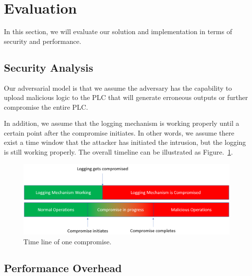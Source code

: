 \section{Evaluation}

In this section, we will evaluate our solution and implementation in terms of security and performance. 

\subsection{Security Analysis}

Our adversarial model is that we assume the adversary has the capability to upload malicious logic to the PLC that will generate erroneous outputs or further compromise the entire PLC. 

In addition, we assume that the logging mechanism is working properly until a certain point after the compromise initiates. In other words, we assume there exist a time window that the attacker has initiated the intrusion, but the logging is still working properly. The overall timeline can be illustrated as Figure.~\ref{fig:timeline}. 

\begin{figure}[h]
  \centering
    \includegraphics[width=\textwidth]{figs/timeline}
    \caption{Time line of one compromise.}
    \label{fig:timeline}
\end{figure}
   
\subsection{Performance Overhead}